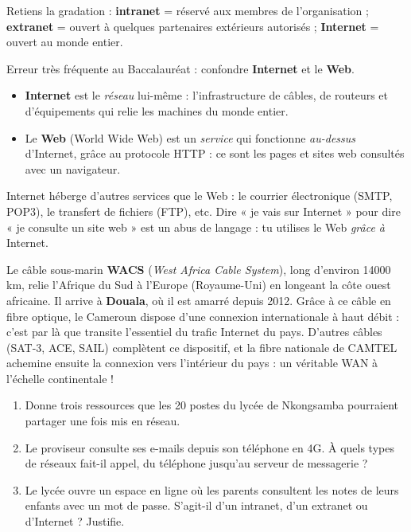 \documentclass[11pt]{article}
\begin{document}
\begin{aretenir}
Retiens la gradation : \textbf{intranet} = réservé aux membres de l'organisation ; \textbf{extranet} = ouvert à quelques partenaires extérieurs autorisés ; \textbf{Internet} = ouvert au monde entier.
\end{aretenir}

\begin{attention}
Erreur très fréquente au Baccalauréat : confondre \textbf{Internet} et le \textbf{Web}.
\begin{itemize}
\item \textbf{Internet} est le \emph{réseau} lui-même : l'infrastructure de câbles, de routeurs et d'équipements qui relie les machines du monde entier.
\item Le \textbf{Web} (World Wide Web) est un \emph{service} qui fonctionne \emph{au-dessus} d'Internet, grâce au protocole HTTP : ce sont les pages et sites web consultés avec un navigateur.
\end{itemize}
Internet héberge d'autres services que le Web : le courrier électronique (SMTP, POP3), le transfert de fichiers (FTP), etc. Dire « je vais sur Internet » pour dire « je consulte un site web » est un abus de langage : tu utilises le Web \emph{grâce à} Internet.
\end{attention}

\begin{savaistu}
Le câble sous-marin \textbf{WACS} (\emph{West Africa Cable System}), long d'environ \num{14000} km, relie l'Afrique du Sud à l'Europe (Royaume-Uni) en longeant la côte ouest africaine. Il arrive à \textbf{Douala}, où il est amarré depuis 2012. Grâce à ce câble en fibre optique, le Cameroun dispose d'une connexion internationale à haut débit : c'est par là que transite l'essentiel du trafic Internet du pays. D'autres câbles (SAT-3, ACE, SAIL) complètent ce dispositif, et la fibre nationale de CAMTEL achemine ensuite la connexion vers l'intérieur du pays : un véritable WAN à l'échelle continentale !
\end{savaistu}

\begin{exercice}
\begin{enumerate}
\item Donne trois ressources que les 20 postes du lycée de Nkongsamba pourraient partager une fois mis en réseau.
\item Le proviseur consulte ses e-mails depuis son téléphone en 4G. À quels types de réseaux fait-il appel, du téléphone jusqu'au serveur de messagerie ?
\item Le lycée ouvre un espace en ligne où les parents consultent les notes de leurs enfants avec un mot de passe. S'agit-il d'un intranet, d'un extranet ou d'Internet ? Justifie.
\end{enumerate}
\end{exercice}
\end{document}
